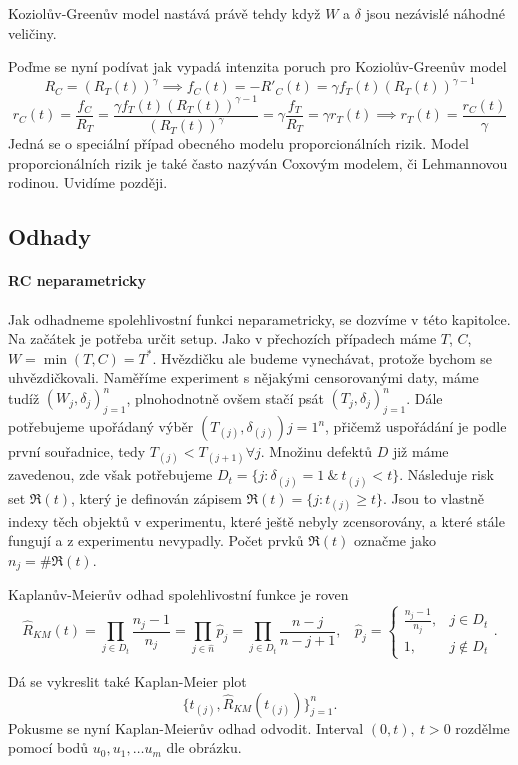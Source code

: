 \begin{theorem}
	Koziolův-Greenův model nastává právě tehdy když $W$ a $\delta$ jsou nezávislé náhodné veličiny.
\end{theorem}
Poďme se nyní podívat jak vypadá intenzita poruch pro Koziolův-Greenův model
$$ R_C = (R_T(t))^{\gamma} \implies f_C(t) = -R'_C(t) = \gamma f_T(t)(R_T(t))^{\gamma-1}$$
$$r_C(t) =\frac{f_C}{R_T}=\frac{\gamma f_T(t)(R_T(t))^{\gamma-1}}{(R_T(t))^{\gamma}} = \gamma \frac{f_T}{R_T} = \gamma r_T(t) \implies r_T(t) = \frac{r_C(t)}{\gamma}$$
Jedná se o speciální případ obecného modelu proporcionálních rizik. Model proporcionálních rizik je také často nazýván Coxovým modelem, či Lehmannovou rodinou.  Uvidíme později.
\subsection{Odhady}
\paragraph{RC neparametricky}
Jak odhadneme spolehlivostní funkci neparametricky, se dozvíme v této kapitolce. Na začátek je potřeba určit setup. Jako v přechozích případech máme $T$, $C$, $W=\min(T,C)=T^{*}$. Hvězdičku ale budeme vynechávat, protože bychom se uhvězdičkovali. Naměříme experiment s nějakými censorovanými daty, máme tudíž $(W_j,\delta_j)_{j=1}^n$, plnohodnotně ovšem stačí psát $(T_j,\delta_j)_{j=1}^n$. Dále potřebujeme upořádaný výběr $(T_{(j)}, \delta_{(j)}){j=1}^n$, přičemž uspořádání je podle první souřadnice, tedy $T_{(j)} < T_{(j+1)} \forall j$. 
Množinu defektů $D$ již máme zavedenou, zde však potřebujeme $D_t =\lbrace j:\delta_{(j)}=1 ~\&~ t_{(j)} < t \rbrace$. Následuje risk set $\mathfrak{R}(t)$, který je definován zápisem $\mathfrak{R}(t) =\lbrace j: t_{(j)} \geq t \rbrace$. Jsou to vlastně indexy těch objektů v experimentu, které ještě nebyly zcensorovány, a které stále fungují a z experimentu nevypadly. Počet prvků $\mathfrak{R}(t)$ označme jako $n_j =\#\mathfrak{R}(t)$.
\begin{define}
	Kaplanův-Meierův odhad spolehlivostní funkce je roven 
	$$\hat{R}_{KM}(t) = \prod_{j\in D_t} \frac{n_j -1}{n_j} = \prod_{j\in \hat{n}} \hat{p}_j = \prod_{j\in D_t} \frac{n-j}{n-j+1},~~~~ \hat{p}_j = \begin{cases}
		\frac{n_j - 1}{n_j},& j\in D_t \\1, & j\notin D_t \end{cases}. $$
\end{define}
Dá se vykreslit také Kaplan-Meier plot $$ \lbrace t_{(j)}, \hat{R}_{KM}(t_{(j)}) \rbrace_{j=1}^n .$$ Pokusme se nyní Kaplan-Meierův odhad odvodit.
Interval $(0,t),~t>0$ rozdělme pomocí bodů $u_0, u_1, \dots u_m$ dle obrázku.

